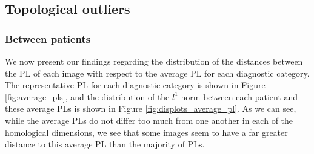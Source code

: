 \documentclass{article}
\begin{document}
\subsection{Topological outliers}

\subsubsection{Between patients}

We now present our findings regarding the distribution of the distances between the PL of each image with respect to the average PL for each diagnostic category. The representative PL for each diagnostic category is shown in Figure \ref{fig:average_pls}, and the distribution of the $l^1$ norm between each patient and these average PLs is shown in Figure \ref{fig:displots_average_pl}. As we can see, while the average PLs do not differ too much from one another in each of the homological dimensions, we see that some images seem to have a far greater distance to this average PL than the majority of PLs.
\end{document}
